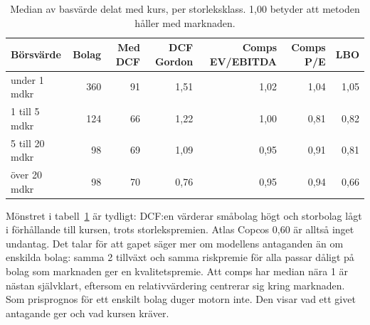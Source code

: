 \begin{table}[H]
\centering\small
\caption{Median av basvärde delat med kurs, per storleksklass. 1,00 betyder att metoden håller
med marknaden.}
\label{tab:universum}
\begin{tabular}{@{}lrrrrrr@{}}
\toprule
Börsvärde & Bolag & Med DCF & DCF Gordon & Comps EV/EBITDA & Comps P/E & LBO \\
\midrule
under 1 mdkr & 360 & 91 & 1,51 & 1,02 & 1,04 & 1,05 \\
1 till 5 mdkr & 124 & 66 & 1,22 & 1,00 & 0,81 & 0,82 \\
5 till 20 mdkr & 98 & 69 & 1,09 & 0,95 & 0,91 & 0,81 \\
över 20 mdkr & 98 & 70 & 0,76 & 0,95 & 0,94 & 0,66 \\
\bottomrule
\end{tabular}
\end{table}

Mönstret i tabell~\ref{tab:universum} är tydligt: DCF:en värderar småbolag högt och storbolag
lågt i förhållande till kursen, trots storlekspremien. Atlas Copcos 0,60 är alltså inget
undantag. Det talar för att gapet säger mer om modellens antaganden än om enskilda bolag:
samma 2\pct{} tillväxt och samma riskpremie för alla passar dåligt på bolag som marknaden ger
en kvalitetspremie. Att comps har median nära 1 är nästan självklart, eftersom en
relativvärdering centrerar sig kring marknaden. Som prisprognos för ett enskilt bolag duger
motorn inte. Den visar vad ett givet antagande ger och vad kursen kräver.
